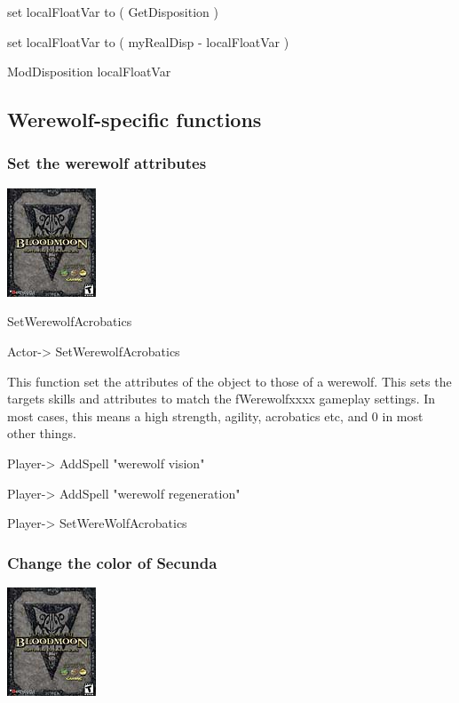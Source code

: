 set localFloatVar to ( GetDisposition )

set localFloatVar to ( myRealDisp - localFloatVar )

ModDisposition localFloatVar

\emph{\hfill\break
}

\hypertarget{werewolf-specific-functions}{%
\subsection{Werewolf-specific
functions}\label{werewolf-specific-functions}}

\hypertarget{set-the-werewolf-attributes}{%
\subsubsection{Set the werewolf
attributes}\label{set-the-werewolf-attributes}}

\includegraphics{media/image7.png}

SetWerewolfAcrobatics

Actor-> SetWerewolfAcrobatics

This function set the attributes of the object to those of a werewolf.
This sets the targets skills and attributes to match the fWerewolfxxxx
gameplay settings. In most cases, this means a high strength, agility,
acrobatics etc, and 0 in most other things.

Player-> AddSpell "werewolf vision"

Player-> AddSpell "werewolf regeneration"

Player-> SetWereWolfAcrobatics

\hypertarget{change-the-color-of-secunda}{%
\subsubsection{Change the color of
Secunda}\label{change-the-color-of-secunda}}

\includegraphics{media/image7.png}

